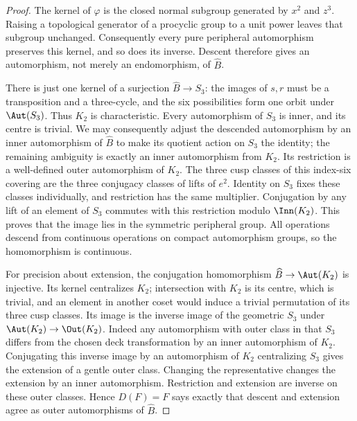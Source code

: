 \begin{proof}
The kernel of $\varphi$ is the closed normal subgroup generated by
$x^2$ and $z^3$. Raising a topological generator of a procyclic group
to a unit power leaves that subgroup unchanged. Consequently every
pure peripheral automorphism preserves this kernel, and so does its
inverse. Descent therefore gives an automorphism, not merely an
endomorphism, of $\widehat B$.

There is just one kernel of a surjection $\widehat B\to S_3$:
the images of $s,r$ must be a transposition and a three-cycle,
and the six possibilities form one orbit under $\Aut(S_3)$.
Thus $K_2$ is characteristic. Every automorphism of $S_3$ is inner,
and its centre is trivial. We may consequently adjust the descended
automorphism by an inner automorphism of $\widehat B$ to make its
quotient action on $S_3$ the identity; the remaining ambiguity is
exactly an inner automorphism from $K_2$. Its restriction is a
well-defined outer automorphism of $K_2$. The three cusp classes
of this index-six covering are the three conjugacy classes of
lifts of $e^2$. Identity on $S_3$ fixes these classes individually,
and restriction has the same multiplier. Conjugation by any lift
of an element of $S_3$ commutes with this restriction modulo
$\Inn(K_2)$. This proves that the image lies in the symmetric
peripheral group. All operations descend from continuous operations
on compact automorphism groups, so the homomorphism is continuous.

For precision about extension, the conjugation homomorphism
$\widehat B\to\Aut(K_2)$ is injective. Its kernel centralizes $K_2$;
intersection with $K_2$ is its centre, which is trivial, and an
element in another coset would induce a trivial permutation of its
three cusp classes. Its image is the inverse image of the geometric
$S_3$ under $\Aut(K_2)\to\Out(K_2)$. Indeed any automorphism with
outer class in that $S_3$ differs from the chosen deck transformation
by an inner automorphism of $K_2$. Conjugating this inverse image by
an automorphism of $K_2$ centralizing $S_3$ gives the extension of a
gentle outer class. Changing the representative changes the extension
by an inner automorphism. Restriction and extension are inverse on
these outer classes. Hence $D(F)=F$ says exactly that descent and
extension agree as outer automorphisms of $\widehat B$.


\end{proof}

